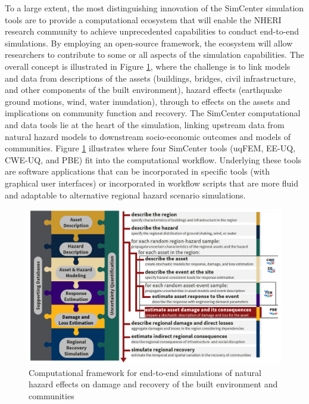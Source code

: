 To a large extent, the most distinguishing innovation of the SimCenter simulation tools are to provide a computational ecosystem that will enable the NHERI research community to achieve unprecedented capabilities to conduct end-to-end simulations. By employing an open-source framework, the ecosystem will allow researchers to contribute to some or all aspects of the simulation capabilities. The overall concept is illustrated in Figure \ref{fig:intro_CompFramework}, where the challenge is to link models and data from descriptions of the assets (buildings, bridges, civil infrastructure, and other components of the built environment), hazard effects (earthquake ground motions, wind, water inundation), through to effects on the assets and implications on community function and recovery. The SimCenter computational and data tools lie at the heart of the simulation, linking upstream data from natural hazard models to downstream socio-economic outcomes and models of communities. Figure \ref{fig:intro_CompFramework} illustrates where four SimCenter tools (uqFEM, EE-UQ, CWE-UQ, and PBE) fit into the computational workflow. Underlying these tools are software applications that can be incorporated in specific tools (with graphical user interfaces) or incorporated in workflow scripts that are more fluid and adaptable to alternative regional hazard scenario simulations. 

\begin{figure}[htb]
    \centering
    \includegraphics[width=1.0\textwidth, angle = 0]{Figures/CompFramework.png}
    \caption{Computational framework for end-to-end simulations of natural hazard effects on damage and recovery of the built environment and communities}
    \label{fig:intro_CompFramework}
\end{figure}

